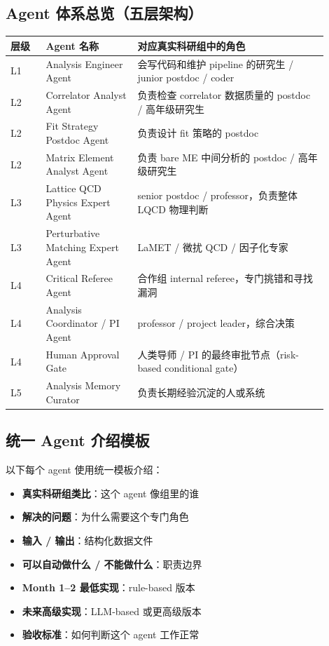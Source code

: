 \documentclass[11pt,a4paper,fontset=fandol]{ctexart}
\begin{document}
\subsection{Agent 体系总览（五层架构）}

\begin{center}
\begin{longtable}{p{0.10\linewidth}p{0.26\linewidth}p{0.54\linewidth}}
\toprule
层级 & Agent 名称 & 对应真实科研组中的角色 \\
\midrule
L1 & Analysis Engineer Agent & 会写代码和维护 pipeline 的研究生 / junior postdoc / coder \\
L2 & Correlator Analyst Agent & 负责检查 correlator 数据质量的 postdoc / 高年级研究生 \\
L2 & Fit Strategy Postdoc Agent & 负责设计 fit 策略的 postdoc \\
L2 & Matrix Element Analyst Agent & 负责 bare ME 中间分析的 postdoc / 高年级研究生 \\
L3 & Lattice QCD Physics Expert Agent & senior postdoc / professor，负责整体 LQCD 物理判断 \\
L3 & Perturbative Matching Expert Agent & LaMET / 微扰 QCD / 因子化专家 \\
L4 & Critical Referee Agent & 合作组 internal referee，专门挑错和寻找漏洞 \\
L4 & Analysis Coordinator / PI Agent & professor / project leader，综合决策 \\
L4 & Human Approval Gate & 人类导师 / PI 的最终审批节点（risk-based conditional gate） \\
L5 & Analysis Memory Curator & 负责长期经验沉淀的人或系统 \\
\bottomrule
\end{longtable}
\end{center}

\subsection{统一 Agent 介绍模板}

以下每个 agent 使用统一模板介绍：

\begin{itemize}
  \item \textbf{真实科研组类比}：这个 agent 像组里的谁
  \item \textbf{解决的问题}：为什么需要这个专门角色
  \item \textbf{输入 / 输出}：结构化数据文件
  \item \textbf{可以自动做什么 / 不能做什么}：职责边界
  \item \textbf{Month 1--2 最低实现}：rule-based 版本
  \item \textbf{未来高级实现}：LLM-based 或更高级版本
  \item \textbf{验收标准}：如何判断这个 agent 工作正常
\end{itemize}
\end{document}
